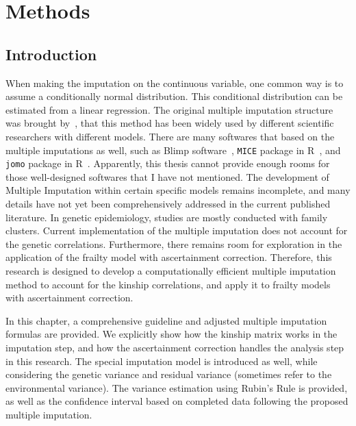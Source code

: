 \chapter{Methods}
\section{Introduction}
When making the imputation on the continuous variable, one common way is to assume a conditionally normal distribution. 
This conditional distribution can be estimated from a linear regression. 
The original multiple imputation structure was brought by~\citet{rubin1987multiple}, that this method has been widely used by different scientific researchers with different models.
There are many softwares that based on the multiple imputations as well, such as Blimp software~\cite{keller2021blimp}, \texttt{MICE} package in R~\cite{royston2011multiple}, and \texttt{jomo} package in R~\cite{quartagno2019jomo}. 
Apparently, this thesis cannot provide enough rooms for those well-designed softwares that I have not mentioned. 
The development of Multiple Imputation within certain specific models remains incomplete, and many details have not yet been comprehensively addressed in the current published literature.
In genetic epidemiology, studies are mostly conducted with family clusters. 
Current implementation of the multiple imputation does not account for the genetic correlations. 
Furthermore, there remains room for exploration in the application of the frailty model with ascertainment correction.
Therefore, this research is designed to develop a computationally efficient multiple imputation method to account for the kinship correlations, and apply it to frailty models with ascertainment correction. 

In this chapter, a comprehensive guideline and adjusted multiple imputation formulas are provided. 
We explicitly show how the kinship matrix works in the imputation step, and how the ascertainment correction handles the analysis step in this research. 
The special imputation model is introduced as well, while considering the genetic variance and residual variance (sometimes refer to the environmental variance).
The variance estimation using Rubin's Rule is provided, as well as the confidence interval based on completed data following the proposed multiple imputation.

